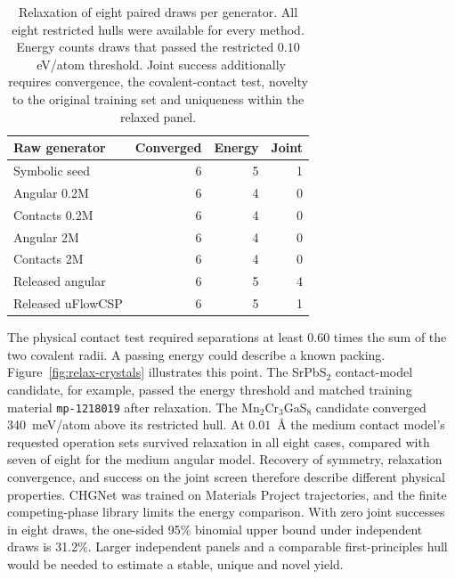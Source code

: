 \begin{table}[tbp]\centering\small
\caption{Relaxation of eight paired draws per generator. All eight restricted hulls were available for every method. Energy counts draws that passed the restricted $0.10$~eV/atom threshold. Joint success additionally requires convergence, the covalent-contact test, novelty to the original training set and uniqueness within the relaxed panel.}
\label{tab:gen-relax}
\begin{tabular}{lrrr}\hline
Raw generator & Converged & Energy & Joint\\\hline
Symbolic seed & 6 & 5 & 1\\
Angular 0.2M & 6 & 4 & 0\\
Contacts 0.2M & 6 & 4 & 0\\
Angular 2M & 6 & 4 & 0\\
Contacts 2M & 6 & 4 & 0\\
Released angular & 6 & 5 & 4\\
Released uFlowCSP & 6 & 5 & 1\\\hline
\end{tabular}
\end{table}



The physical contact test required separations at least 0.60 times the sum of the two covalent radii. A passing energy could describe a known packing. Figure~\ref{fig:relax-crystals} illustrates this point. The SrPbS$_2$ contact-model candidate, for example, passed the energy threshold and matched training material \texttt{mp-1218019} after relaxation. The Mn$_2$Cr$_3$GaS$_8$ candidate converged 340~meV/atom above its restricted hull. At $0.01$~\AA{} the medium contact model's requested operation sets survived relaxation in all eight cases, compared with seven of eight for the medium angular model. Recovery of symmetry, relaxation convergence, and success on the joint screen therefore describe different physical properties. CHGNet was trained on Materials Project trajectories, and the finite competing-phase library limits the energy comparison. With zero joint successes in eight draws, the one-sided 95\% binomial upper bound under independent draws is 31.2\%. Larger independent panels and a comparable first-principles hull would be needed to estimate a stable, unique and novel yield.
